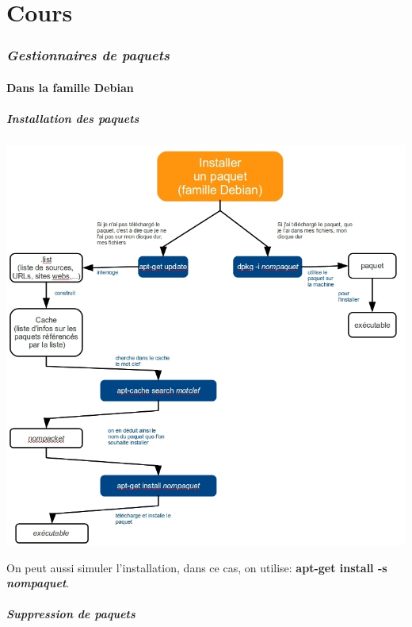 \documentclass{article}
\begin{document}
\tableofcontents
\newpage

\part{Cours}
\section{\textit{Gestionnaires de paquets}}
\subsection{Dans la famille Debian}
\subsubsection{Installation des paquets}

\includegraphics[scale=4]{gestDeb.jpg}

On peut aussi simuler l'installation, dans ce cas, on utilise: \textbf{apt-get install -s \textit{nompaquet}}.\\

\subsubsection{Suppression de paquets}
\end{document}
